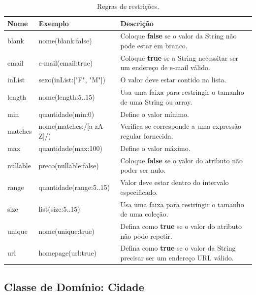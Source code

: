 \begin{table}[htbp]
\centering
\begin{footnotesize}
\begin{tabular}{p{2.0cm} | p{4.5cm} | p{6.5cm}}
\toprule     
\rowcolor{Gray}     
\textbf{Nome}     &     \textbf{Exemplo}     & \textbf{Descrição}\\  
\midrule 
blank &  nome(blank:false) & Coloque {\bf false}  se o valor da  String não pode
estar em branco.\\
\midrule
email &  e-mail(email:true) & Coloque {\bf  true} se a String  necessitar ser um
endereço de e-mail válido.\\
\midrule 
inList & sexo(inList:["F", "M"]) & O valor deve estar contido
na  lista.  \\  
\midrule  
length &  nome(length:5..15) & Usa  uma faixa para  restringir o tamanho  de uma
String ou array.\\
\midrule
min & quantidade(min:0) & Define o valor mínimo. \\
\midrule 
matches  & nome(matches:/[a-zA-Z]/) &  Verifica se  corresponde a  uma expressão
regular fornecida.  \\
\midrule   
max & quantidade(max:100) & Define o valor máximo. \\
\midrule
nullable &  preco(nullable:false) & Coloque {\bf  false} se o  valor do atributo
não poder ser nulo. \\
\midrule  
range  &  quantidade(range:5..15)  &   Valor  deve  estar  dentro  do  intervalo
especificado.  \\
\midrule  
size  & list(size:5..15)  &  Usa uma  faixa  para restringir  o  tamanho de  uma
coleção.\\
\midrule  
unique & nome(unique:true)  & Defina como {\bf true} se o  valor do atributo não
pode repetir. \\
\midrule
url & homepage(url:true)  & Defina como {\bf true} se o valor da String precisar
ser um endereço URL válido.  \\
\bottomrule
\end{tabular}
\end{footnotesize}
\caption{Regras de restrições.}
\label{restricoesTbl}
\end{table}

\newpage

\subsection{Classe de Domínio: Cidade}\label{secCidade}

